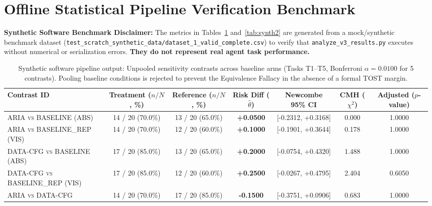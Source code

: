 \documentclass[11pt,a4paper]{article}
\begin{document}



\clearpage
\appendix

\section{Offline Statistical Pipeline Verification Benchmark}
\label{app:benchmark}

\textbf{Synthetic Software Benchmark Disclaimer:} The metrics in Tables~\ref{tab:synth1} and~\ref{tab:synth2} are generated from a mock/synthetic benchmark dataset (\texttt{test\_scratch\_synthetic\_data/dataset\_1\_valid\_complete.csv}) to verify that \texttt{analyze\_v3\_results.py} executes without numerical or serialization errors. \textbf{They do not represent real agent task performance.}

\begin{table}[t]
\centering
\small
\caption{Synthetic software pipeline output: Unpooled sensitivity contrasts across baseline arms (Tasks T1--T5, Bonferroni $\alpha = 0.0100$ for 5 contrasts). Pooling baseline conditions is rejected to prevent the Equivalence Fallacy in the absence of a formal TOST margin.}
\label{tab:synth1}
\begin{tabular*}{\textwidth}{@{\extracolsep{\fill}}lcccccc@{}}
\toprule
\textbf{Contrast ID} & \shortstack{\textbf{Treatment} \\ \scriptsize($n/N$, \%)} & \shortstack{\textbf{Reference} \\ \scriptsize($n/N$, \%)} & \shortstack{\textbf{Risk Diff} \\ \scriptsize($\hat{\theta}$)} & \textbf{Newcombe 95\% CI} & \shortstack{\textbf{CMH} \\ \scriptsize($\chi^2$)} & \shortstack{\textbf{Adjusted} \\ \scriptsize($p$-value)} \\
\midrule
\textsc{ARIA vs BASELINE (ABS)}          & 14 / 20 (70.0\%) & 13 / 20 (65.0\%) & \textbf{+0.0500} & [-0.2312, +0.3168] & 0.000 & 1.0000 \\
\textsc{ARIA vs BASELINE\_REP (VIS)}      & 14 / 20 (70.0\%) & 12 / 20 (60.0\%) & \textbf{+0.1000} & [-0.1901, +0.3644] & 0.178 & 1.0000 \\
\textsc{DATA-CFG vs BASELINE (ABS)}      & 17 / 20 (85.0\%) & 13 / 20 (65.0\%) & \textbf{+0.2000} & [-0.0754, +0.4320] & 1.488 & 1.0000 \\
\textsc{DATA-CFG vs BASELINE\_REP (VIS)}  & 17 / 20 (85.0\%) & 12 / 20 (60.0\%) & \textbf{+0.2500} & [-0.0267, +0.4795] & 2.404 & 0.6050 \\
\textsc{ARIA vs DATA-CFG}               & 14 / 20 (70.0\%) & 17 / 20 (85.0\%) & \textbf{-0.1500} & [-0.3751, +0.0906] & 0.683 & 1.0000 \\
\bottomrule
\end{tabular*}
\end{table}
\end{document}
